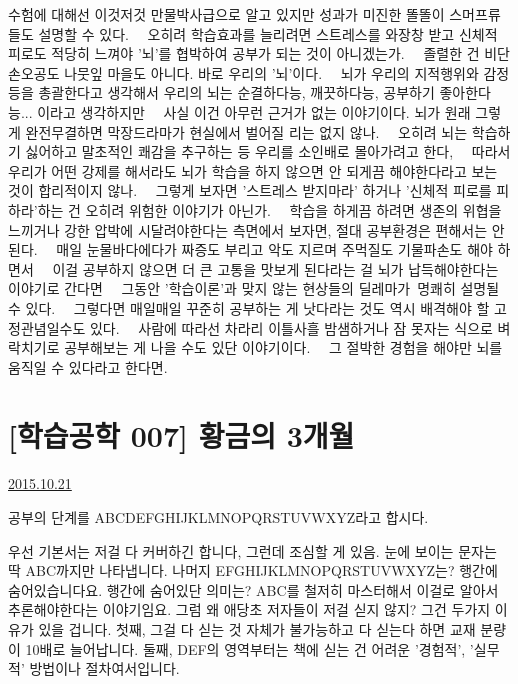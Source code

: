 수험에 대해선 이것저것 만물박사급으로 알고 있지만 성과가 미진한 똘똘이 스머프류들도 설명할 수 있다.   오히려 학습효과를 늘리려면 스트레스를 와장창 받고 신체적 피로도 적당히 느껴야 '뇌'를 협박하여 공부가 되는 것이 아니겠는가.   졸렬한 건 비단 손오공도 나뭇잎 마을도 아니다. 바로 우리의 '뇌'이다.   뇌가 우리의 지적행위와 감정 등을 총괄한다고 생각해서 우리의 뇌는 순결하다능, 깨끗하다능, 공부하기 좋아한다능... 이라고 생각하지만   사실 이건 아무런 근거가 없는 이야기이다. 뇌가 원래 그렇게 완전무결하면 막장드라마가 현실에서 벌어질 리는 없지 않나.   오히려 뇌는 학습하기 싫어하고 말초적인 쾌감을 추구하는 등 우리를 소인배로 몰아가려고 한다,   따라서 우리가 어떤 강제를 해서라도 뇌가 학습을 하지 않으면 안 되게끔 해야한다라고 보는 것이 합리적이지 않나.   그렇게 보자면 '스트레스 받지마라' 하거나 '신체적 피로를 피하라'하는 건 오히려 위험한 이야기가 아닌가.   학습을 하게끔 하려면 생존의 위협을 느끼거나 강한 압박에 시달려야한다는 측면에서 보자면, 절대 공부환경은 편해서는 안 된다.   매일 눈물바다에다가 짜증도 부리고 악도 지르며 주먹질도 기물파손도 해야 하면서   이걸 공부하지 않으면 더 큰 고통을 맛보게 된다라는 걸 뇌가 납득해야한다는 이야기로 간다면   그동안 '학습이론'과 맞지 않는 현상들의 딜레마가 명쾌히 설명될 수 있다.   그렇다면 매일매일 꾸준히 공부하는 게 낫다라는 것도 역시 배격해야 할 고정관념일수도 있다.   사람에 따라선 차라리 이틀사흘 밤샘하거나 잠 못자는 식으로 벼락치기로 공부해보는 게 나을 수도 있단 이야기이다.   그 절박한 경험을 해야만 뇌를 움직일 수 있다라고 한다면.







\section{[학습공학 007] 황금의 3개월}
\href{https://www.kockoc.com/Apoc/432268}{2015.10.21}

\vspace{5mm}

공부의 단계를 ABCDEFGHIJKLMNOPQRSTUVWXYZ라고 합시다.
\vspace{5mm}

우선 기본서는 저걸 다 커버하긴 합니다, 그런데 조심할 게 있음.
눈에 보이는 문자는 딱 ABC까지만 나타냅니다.
나머지 EFGHIJKLMNOPQRSTUVWXYZ는? 행간에 숨어있습니다요.
행간에 숨어있단 의미는? ABC를 철저히 마스터해서 이걸로 알아서 추론해야한다는 이야기임요.
그럼 왜 애당초 저자들이 저걸 싣지 않지? 그건 두가지 이유가 있을 겁니다.
첫째, 그걸 다 싣는 것 자체가 불가능하고 다 싣는다 하면 교재 분량이 10배로 늘어납니다.
둘째, DEF의 영역부터는 책에 싣는 건 어려운 '경험적', '실무적' 방법이나 절차여서입니다.
\vspace{5mm}

